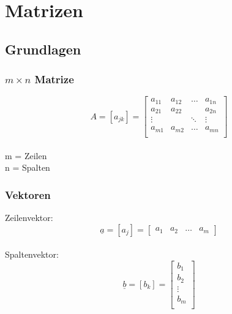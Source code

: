 



\chapter{Matrizen}

\section{Grundlagen}
\subsection*{$m\times n$ Matrize}
\[
	A = \left[ a_{jk} \right] =
	\begin{bmatrix}
		a_{11} & a_{12} & \ldots & a_{1n} \\
		a_{21} & a_{22} &  & a_{2n} \\
		\vdots &  & \ddots & \vdots \\
		a_{m1} & a_{m2} & \ldots & a_{mn} \\
	\end{bmatrix}
\]
\\
m = Zeilen\\
n = Spalten

\subsection*{Vektoren}
Zeilenvektor:
\[
	\underline{a} = \left[ a_j \right] =
	\begin{bmatrix}
		a_1 & a_2 & \ldots & a_m
	\end{bmatrix}
\]
\\
Spaltenvektor:
\[
	\underline{b} = \left[ b_k \right] =
	\begin{bmatrix}
		b_1 \\ b_2 \\ \vdots \\ b_m \\
	\end{bmatrix}
\]
